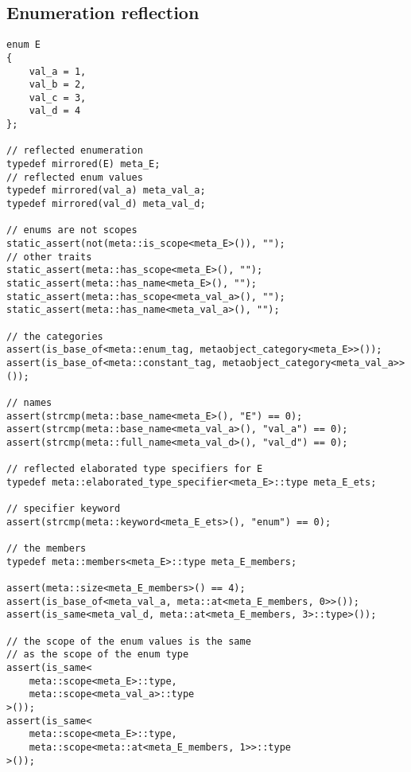 \subsection{Enumeration reflection}

\begin{verbatim}
enum E
{
	val_a = 1,
	val_b = 2,
	val_c = 3,
	val_d = 4
};

// reflected enumeration
typedef mirrored(E) meta_E;
// reflected enum values
typedef mirrored(val_a) meta_val_a;
typedef mirrored(val_d) meta_val_d;

// enums are not scopes
static_assert(not(meta::is_scope<meta_E>()), "");
// other traits
static_assert(meta::has_scope<meta_E>(), "");
static_assert(meta::has_name<meta_E>(), "");
static_assert(meta::has_scope<meta_val_a>(), "");
static_assert(meta::has_name<meta_val_a>(), "");

// the categories
assert(is_base_of<meta::enum_tag, metaobject_category<meta_E>>());
assert(is_base_of<meta::constant_tag, metaobject_category<meta_val_a>>());

// names
assert(strcmp(meta::base_name<meta_E>(), "E") == 0);
assert(strcmp(meta::base_name<meta_val_a>(), "val_a") == 0);
assert(strcmp(meta::full_name<meta_val_d>(), "val_d") == 0);

// reflected elaborated type specifiers for E
typedef meta::elaborated_type_specifier<meta_E>::type meta_E_ets;

// specifier keyword
assert(strcmp(meta::keyword<meta_E_ets>(), "enum") == 0);

// the members
typedef meta::members<meta_E>::type meta_E_members;

assert(meta::size<meta_E_members>() == 4);
assert(is_base_of<meta_val_a, meta::at<meta_E_members, 0>>());
assert(is_same<meta_val_d, meta::at<meta_E_members, 3>::type>());

// the scope of the enum values is the same
// as the scope of the enum type
assert(is_same<
	meta::scope<meta_E>::type,
	meta::scope<meta_val_a>::type
>());
assert(is_same<
	meta::scope<meta_E>::type,
	meta::scope<meta::at<meta_E_members, 1>>::type
>());

\end{verbatim}

